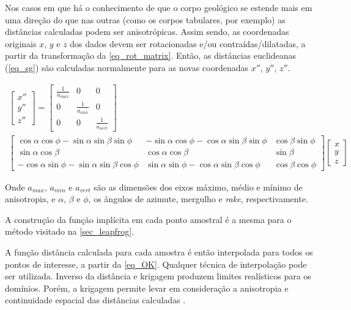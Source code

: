 Nos casos em que há o conhecimento de que o corpo geológico se estende mais em uma direção do que nas outras (como os corpos tabulares, por exemplo) as distâncias calculadas podem ser anisotrópicas. Assim sendo, as coordenadas originais $x$, $y$ e $z$ dos dados devem ser rotacionadas e/ou contraídas/dilatadas, a partir da transformação da \autoref{eq_rot_matrix}. Então, as distâncias euclideanas (\autoref{eq_sg}) são calculadas normalmente para as novas coordenadas $x''$, $y''$, $z''$.

\begin{equation}
\begin{gathered}
\begin{bmatrix} x'' \\ y'' \\ z'' \end{bmatrix} = \begin{bmatrix} \frac{1}{a_{max}} & 0 & 0 \\ 0 & \frac{1}{a_{min}} & 0 \\ 0 & 0 & \frac{1}{a_{vert}} \end{bmatrix} \\ \begin{bmatrix}\cos\alpha\cos\phi-\sin\alpha\sin\beta\sin\phi & -\sin\alpha\cos\phi-\cos\alpha\sin\beta\sin\phi & \cos\beta\sin\phi \\ \sin\alpha\cos\beta & \cos\alpha\cos\beta & \sin\beta \\ -\cos\alpha\sin\phi-\sin\alpha\sin\beta\cos\phi & \sin\alpha\sin\phi-\cos\alpha\sin\beta\cos\phi & \cos\beta\cos\phi \end{bmatrix} \begin{bmatrix} x \\ y \\ z \end{bmatrix}
\end{gathered}
	\label{eq_rot_matrix}
\end{equation}

Onde $a_{max}$, $a_{min}$ e $a_{vert}$ são as dimensões dos eixos máximo, médio e mínimo de anisotropia, e $\alpha$, $\beta$ e $\phi$, os ângulos de azimute, mergulho e \textit{rake}, respectivamente.   

A construção da função implícita em cada ponto amostral é a mesma para o método visitado na \autoref{sec_leapfrog}.

A função distância calculada para cada amostra é então interpolada para todos os pontos de interesse, a partir da \autoref{eq_OK}. Qualquer técnica de interpolação pode ser utilizada. Inverso da distância e krigagem produzem limites realísticos para os domínios. Porém, a krigagem permite levar em consideração a anisotropia e continuidade espacial das distâncias calculadas \cite{silvaanddeutschccgmodeling}.

